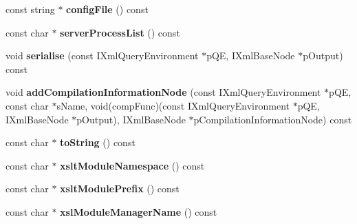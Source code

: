 \begin{DoxyCompactItemize}
\item 
\hypertarget{classgeneral__server_1_1Server_a226a262a67aefbfbe482dbecfeff9b7d}{const string $\ast$ {\bfseries config\-File} () const }\label{classgeneral__server_1_1Server_a226a262a67aefbfbe482dbecfeff9b7d}

\item 
\hypertarget{classgeneral__server_1_1Server_a7ef2080de6a3fb34e7f6703ea691ff63}{const char $\ast$ {\bfseries server\-Process\-List} () const }\label{classgeneral__server_1_1Server_a7ef2080de6a3fb34e7f6703ea691ff63}

\item 
\hypertarget{classgeneral__server_1_1Server_a58abab17577a8cace1b9f24bfeecb0cf}{void {\bfseries serialise} (const \-I\-Xml\-Query\-Environment $\ast$p\-Q\-E, \-I\-Xml\-Base\-Node $\ast$p\-Output) const }\label{classgeneral__server_1_1Server_a58abab17577a8cace1b9f24bfeecb0cf}

\item 
\hypertarget{classgeneral__server_1_1Server_acd2c5572bd0baa8bd6c80bb9f93c68df}{void {\bfseries add\-Compilation\-Information\-Node} (const \-I\-Xml\-Query\-Environment $\ast$p\-Q\-E, const char $\ast$s\-Name, void(comp\-Func)(const \-I\-Xml\-Query\-Environment $\ast$p\-Q\-E, \-I\-Xml\-Base\-Node $\ast$p\-Output), \-I\-Xml\-Base\-Node $\ast$p\-Compilation\-Information\-Node) const }\label{classgeneral__server_1_1Server_acd2c5572bd0baa8bd6c80bb9f93c68df}

\item 
\hypertarget{classgeneral__server_1_1Server_ac475c2f33d3bf9a95056943cb3c38a63}{const char $\ast$ {\bfseries to\-String} () const }\label{classgeneral__server_1_1Server_ac475c2f33d3bf9a95056943cb3c38a63}

\item 
\hypertarget{classgeneral__server_1_1Server_ab02ea1c11f8efe2fcf5ea61b3e1912da}{const char $\ast$ {\bfseries xslt\-Module\-Namespace} () const }\label{classgeneral__server_1_1Server_ab02ea1c11f8efe2fcf5ea61b3e1912da}

\item 
\hypertarget{classgeneral__server_1_1Server_a2a5ad61783c8dbb49b488c1aadae7a19}{const char $\ast$ {\bfseries xslt\-Module\-Prefix} () const }\label{classgeneral__server_1_1Server_a2a5ad61783c8dbb49b488c1aadae7a19}

\item 
\hypertarget{classgeneral__server_1_1Server_ab4b6aa164b56ad1f600f4fe427a2fa33}{const char $\ast$ {\bfseries xsl\-Module\-Manager\-Name} () const }\label{classgeneral__server_1_1Server_ab4b6aa164b56ad1f600f4fe427a2fa33}


\end{DoxyCompactItemize}
